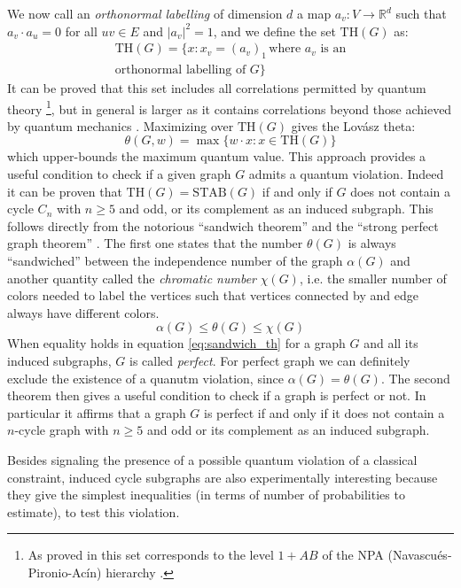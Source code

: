 \documentclass[letterpaper]{article}
\newcommand{\Real}{\mathbb{R}}
\newcommand{\STAB}{\mathrm{STAB}}
\renewcommand{\TH}{\mathrm{TH}}
\begin{document}
We now call an \emph{orthonormal labelling} of dimension $d$ a map
$a_v:V \rightarrow \Real^d$ such that $a_v \cdot a_u = 0$ for all $uv \in E$ and
$|a_v|^2 = 1$, and we define the set $\TH(G)$ as:
\begin{multline}
    \TH(G) = \{x: x_v = (a_v)_1 \, \text{where $a_v$ is an} \\ \text{orthonormal labelling of $G$}\}
    \label{eq:thbody}
\end{multline}
It can be proved that this set includes all correlations permitted by quantum
theory \footnote{As proved in \cite{acin2015} this set corresponds to the level
$1+AB$ of the NPA (Navascués-Pironio-Acín) hierarchy \cite{npa2008}.}, 
but in general is larger as it contains correlations beyond those achieved by quantum
mechanics \cite{almostquantum2015}.
Maximizing over $\TH(G)$ gives the Lovász theta:
\begin{equation}
    \theta(G,w) = \max \{w\cdot x : x \in \TH(G)\}
    \label{eq:lovasztheta}
\end{equation}
which upper-bounds the maximum quantum value.
This approach provides a useful condition to check if a given graph $G$ admits a
quantum violation. Indeed it can be proven that $\TH(G) = \STAB(G)$ if and only
if $G$ does not contain a cycle $C_n$ with $n \ge 5$ and odd, or its complement
as an induced subgraph. 
This follows directly from the notorious ``sandwich theorem''\cite{knuth,lovasz} and the ``strong
perfect graph theorem'' \cite{spgth}.
The first one states that the number $\theta(G)$ is always ``sandwiched''
between the independence number of the graph $\alpha(G)$ and another quantity
called the \emph{chromatic number} $\chi(G)$, i.e. the smaller number of colors needed
to label the vertices such that vertices connected by and edge always have
different colors.
\begin{equation}
    \alpha(G) \le \theta(G) \le \chi(G)
    \label{eq:sandwich_th}
\end{equation}
When equality holds in equation \eqref{eq:sandwich_th} for a graph $G$ and all its
induced subgraphs, $G$ is called \emph{perfect}.
For perfect graph we can definitely exclude the existence of a quanutm
violation, since $\alpha(G) = \theta(G)$.
The second theorem then gives a useful condition to check if a graph is perfect
or not.  In particular it affirms that a graph $G$ is perfect if and only if it
does not contain a $n$-cycle graph with $n\ge5$ and odd or its complement as an
induced subgraph.

Besides signaling the presence of a possible quantum violation of a classical
constraint, induced cycle subgraphs are also experimentally interesting because
they give the simplest inequalities (in terms of number of probabilities to
estimate), to test this violation.
\end{document}
